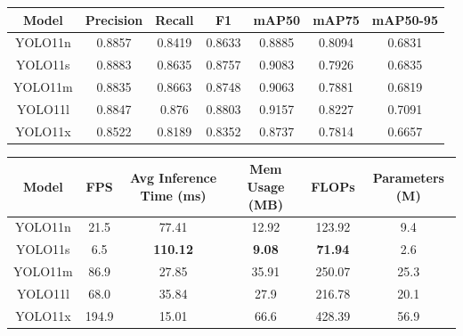 \begin{tabular}{|c|c|c|c|c|c|c|}
\hline
Model & Precision & Recall & F1 & mAP50 & mAP75 & mAP50-95 \\
\hline
YOLO11n & 0.8857 & 0.8419 & 0.8633 & 0.8885 & 0.8094 & 0.6831 \\
YOLO11s & 0.8883 & 0.8635 & 0.8757 & 0.9083 & 0.7926 & 0.6835 \\
YOLO11m & 0.8835 & 0.8663 & 0.8748 & 0.9063 & 0.7881 & 0.6819 \\
YOLO11l & 0.8847 & 0.876 & 0.8803 & 0.9157 & 0.8227 & 0.7091 \\
YOLO11x & 0.8522 & 0.8189 & 0.8352 & 0.8737 & 0.7814 & 0.6657 \\
\hline
\end{tabular}


\begin{tabular}{|c|c|c|c|c|c|}
\hline
Model & FPS & Avg Inference Time (ms) & Mem Usage (MB) & FLOPs & Parameters (M) \\
\hline
YOLO11n & 21.5 & 77.41 & 12.92 & 123.92 & 9.4 \\
YOLO11s & 6.5 & \textbf{110.12} & \textbf{9.08} & \textbf{71.94} & 2.6 \\
YOLO11m & 86.9 & 27.85 & 35.91 & 250.07 & 25.3 \\
YOLO11l & 68.0 & 35.84 & 27.9 & 216.78 & 20.1 \\
YOLO11x & 194.9 & 15.01 & 66.6 & 428.39 & 56.9 \\
\hline
\end{tabular}
